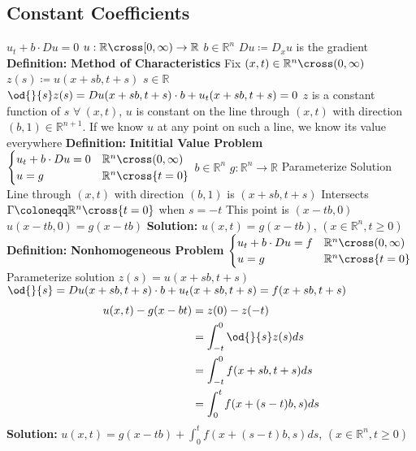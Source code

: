 \documentclass[14pt]{extarticle}
\def\Definition{{\color{blue} \textbf{Definition:} }}
\def\Solution{{\color{cyan} \textbf{Solution:} }}
\begin{document}
\begin{outline}
			\subsection*{Constant Coefficients}
				\1	$u_t + b \cdot Du = 0$
					\2	$u : \mathbb{R} \cross [0,\infty) \rightarrow \mathbb{R}$ 
					\2	$b \in \mathbb{R}^n$
					\2	$Du \coloneqq D_xu$ is the gradient
				\1	\Definition \textbf{Method of Characteristics}
					\2	Fix $(x,t) \in \mathbb{R}^n \cross (0,\infty)$
					\2	$z(s) \coloneqq u(x + sb,t + s)$
						\3	$s \in \mathbb{R}$
					\2	$\od{}{s}z(s) = Du(x+sb,t+s) \cdot b + u_t(x+sb,t+s) = 0$
						\3	$z$ is a constant function of $s$
						\3	$\forall~(x,t)$, $u$ is constant on the line through $(x,t)$
								with direction $(b,1) \in \mathbb{R}^{n+1}$.  
						\3	If we know $u$ at any point on such a line, we know its value
								everywhere
				\1	\Definition \textbf{Inititial Value Problem}
					\2	$\begin{cases}
									u_t + b \cdot Du = 0 & \mathbb{R}^n \cross (0,\infty) \\
									u = g & \mathbb{R}^n \cross \{t=0\}
								\end{cases}$
						\3	$b \in \mathbb{R}^n$
						\3	$g : \mathbb{R}^n \rightarrow \mathbb{R}$
					\2	Parameterize Solution
						\3	Line through $(x,t)$ with direction $(b,1)$ is $(x+sb,t+s)$
						\3	Intersects $\Gamma \coloneqq \mathbb{R}^n \cross \{t=0\}$ when
								$s = -t$
						\3	This point is $(x-tb,0)$
						\3	$u(x-tb,0) = g(x-tb)$
					\2	\Solution $u(x,t) = g(x - tb)$, $(x \in \mathbb{R}^n,t \ge 0)$
				\1	\Definition \textbf{Nonhomogeneous Problem}
					\2	$\begin{cases}
								u_t + b \cdot Du = f & \mathbb{R}^n \cross (0,\infty) \\
								u = g & \mathbb{R}^n \cross \{t=0\}
							\end{cases}$
					\2	Parameterize solution
						\3	$z(s) = u(x+sb,t+s)$ 
						\3	$\od{}{s} = Du(x+sb,t+s) \cdot b + u_t(x+sb,t+s) = f(x+sb,t+s)$
								\begin{align*}
									u(x,t) - g(x-bt) &= z(0) - z(-t) \\
										&= \int_{-t}^0 \od{}{s}z(s) ds \\
										&= \int_{-t}^0 f(x+sb,t+s)ds \\
										&= \int_0^t f(x+(s-t)b,s)ds \\
								\end{align*}
					\2	\Solution $u(x,t) = g(x-tb) + \int_0^t f(x+(s-t)b,s)ds$, $(x \in \mathbb{R}^n,t\ge 0)$

\end{outline}
\end{document}
